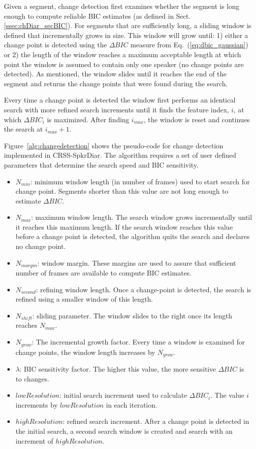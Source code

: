 Given a segment, change detection first examines whether the segment is long enough to compute reliable BIC estimates (as defined in Sect.\ref{ssec:chDiar_secBIC}). 
For segments that are sufficiently long, a sliding window is defined that incrementally grows in size. 
This window will grow until: 1) either a change point is detected using the $\Delta BIC$ measure from Eq.~(\ref{eq:dbic_gaussian}) or 2) the length of the window reaches a maximum acceptable length at which point the window is assumed to contain only one speaker (no change points are detected). 
As mentioned, the window slides until it reaches the end of the segment and returns the change points that were found during the search. 

Every time a change point is detected the window first performs an identical search with more refined search increments until it finds the feature index, $i$, at which $\Delta BIC_i$ is maximized. 
After finding $i_{max}$, the window is reset and continues the search at $i_{max}+1$. 

Figure~\ref{alg:changedetection} shows the pseudo-code for change detection implemented in CRSS-SpkrDiar. 
The algorithm requires a set of user defined parameters that determine the search speed and BIC sensitivity. 
\begin{itemize}
	\item $N_{min}$: minimum window length (in number of frames) used to start search for change point. Segments shorter than this value are not long enough to estimate $\Delta BIC$. 
	\item $N_{max}$: maximum window length. The search window grows incrementally until it reaches this maximum length. If the search window reaches this value before a change point is detected, the algorithm quits the search and declares no change point. 
	\item $N_{margin}$: window margin. These margins are used to assure that sufficient number of frames are available to compute BIC estimates. 
	\item $N_{second}$: refining window length. Once a change-point is detected, the search is refined using a smaller window of this length. 
	\item $N_{shift}$: sliding parameter. The window slides to the right once its length reaches $N_{max}$. 
	\item $N_{grow}$: The incremental growth factor. Every time a window is examined for change points, the window length increases by $N_{grow}$.
	\item $\lambda$: BIC sensitivity factor. The higher this value, the more sensitive $\Delta BIC$ is to changes. 
	\item $lowResolution$: initial search increment used to calculate $\Delta BIC_i$. The value $i$ increments by $lowResolution$ in each iteration.
	\item $highResolution$: refined search increment. After a change point is detected in the initial search, a second search window is created and search with an increment of $highResolution$. 
\end{itemize}

